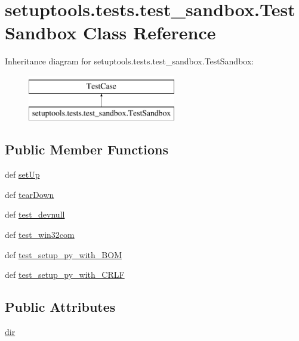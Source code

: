 \hypertarget{classsetuptools_1_1tests_1_1test__sandbox_1_1TestSandbox}{}\section{setuptools.\+tests.\+test\+\_\+sandbox.\+Test\+Sandbox Class Reference}
\label{classsetuptools_1_1tests_1_1test__sandbox_1_1TestSandbox}
Inheritance diagram for setuptools.\+tests.\+test\+\_\+sandbox.\+Test\+Sandbox\+:\begin{figure}[H]
\begin{center}
\leavevmode
\includegraphics[height=2.000000cm]{classsetuptools_1_1tests_1_1test__sandbox_1_1TestSandbox}
\end{center}
\end{figure}
\subsection*{Public Member Functions}
\begin{DoxyCompactItemize}
\item 
def \hyperlink{classsetuptools_1_1tests_1_1test__sandbox_1_1TestSandbox_a797007c39d38d86a6792050d51f52713}{set\+Up}
\item 
def \hyperlink{classsetuptools_1_1tests_1_1test__sandbox_1_1TestSandbox_a8e5dc5bff863894fe040e433ae6e9eb1}{tear\+Down}
\item 
def \hyperlink{classsetuptools_1_1tests_1_1test__sandbox_1_1TestSandbox_a570f1ba47036f95d1ed5df2570672556}{test\+\_\+devnull}
\item 
def \hyperlink{classsetuptools_1_1tests_1_1test__sandbox_1_1TestSandbox_a74359f1ac26aeebc5efd1811227e211b}{test\+\_\+win32com}
\item 
def \hyperlink{classsetuptools_1_1tests_1_1test__sandbox_1_1TestSandbox_a8e0755eea1998e18e85f155c2c6b3c50}{test\+\_\+setup\+\_\+py\+\_\+with\+\_\+\+B\+O\+M}
\item 
def \hyperlink{classsetuptools_1_1tests_1_1test__sandbox_1_1TestSandbox_af50e80bc51e791d084a5ffc4d69f601c}{test\+\_\+setup\+\_\+py\+\_\+with\+\_\+\+C\+R\+L\+F}
\end{DoxyCompactItemize}
\subsection*{Public Attributes}
\begin{DoxyCompactItemize}
\item 
\hyperlink{classsetuptools_1_1tests_1_1test__sandbox_1_1TestSandbox_ae369859371841e473b4342fa9e7ccb01}{dir}
\end{DoxyCompactItemize}


